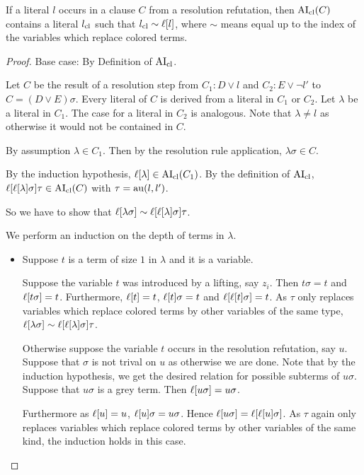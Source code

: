 \documentclass[,%
	paper=a4,%
	DIV15, 
	liststotoc,
	bibtotoc,
	draft=false,%
	numbers=noendperiod
]{scrartcl}
\begin{document}
\begin{lemma} 
	If a literal $l$ occurs in a clause $C$ from a resolution refutation,
	then $\operatorname{AI}_\mathrm{cl}(C)$ contains a literal $l_\mathrm{cl}$ such that $l_\mathrm{cl} \sim \ell[l]$, where $\sim$ means equal up to the index of the variables which replace colored terms.
\end{lemma}
\begin{proof}
	Base case: By Definition of $\operatorname{AI}_\mathrm{cl}$.

	Let $C$ be the result of a resolution step from $C_1: D\lor l$ and $C_2: E\lor \lnot l'$ to $C = (D \lor E)\sigma$.
	Every literal of $C$ is derived from a literal in $C_1$ or $C_2$. Let $\lambda$ be a literal in $C_1$. The case for a literal in $C_2$ is analogous.
	Note that $\lambda \neq l$ as otherwise it would not be contained in $C$.

	By assumption $\lambda \in C_1$. Then by the resolution rule application, $\lambda\sigma \in C$.

	By the induction hypothesis, $\ell[\lambda] \in \operatorname{AI}_\mathrm{cl}(C_1)$.
	By the definition of $\operatorname{AI}_\mathrm{cl}$, $\ell[\ell[\lambda]\sigma]\tau \in \operatorname{AI}_\mathrm{cl}(C)$ 
	with $\tau = \operatorname{au}(l, l')$.

	So we have to show that $\ell[ \lambda \sigma ]  \sim \ell[\ell[\lambda]\sigma]\tau$.

	We perform an induction on the depth of terms in $\lambda$.
	\begin{itemize}
			\item Suppose $t$ is a term of size $1$ in $\lambda$ and  it is a variable.

				Suppose the variable $t$ was introduced by a lifting, say $z_i$.
				Then $t\sigma = t$ and $\ell[t\sigma] = t$.
				Furthermore, $\ell[t] = t$, $\ell[t]\sigma = t$ and $\ell[\ell[t]\sigma] = t$.
				As $\tau$ only replaces variables which replace colored terms by other variables of the same type, $\ell[\lambda \sigma] \sim \ell[\ell[\lambda]\sigma]\tau$.

				Otherwise suppose the variable $t$ occurs in the resolution refutation, say $u$.
				Suppose that $\sigma$ is not trival on $u$ as otherwise we are done.
				Note that by the induction hypothesis, we get the desired relation for possible subterms of $u\sigma$.
				Suppose that $u\sigma$ is a grey term. Then $\ell[u\sigma] = u\sigma$. 

				Furthermore as $\ell[u] = u$, $\ell[u]\sigma = u\sigma$. Hence $\ell[u\sigma] = \ell[\ell[u]\sigma]$. 
				As $\tau$ again only replaces variables which replace colored terms by other variables of the same kind, the induction holds in this case. 


\end{itemize}
\end{proof}
\end{document}
